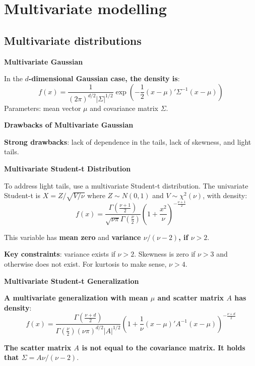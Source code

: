 \documentclass[12pt,a4paper]{article}
\begin{document}
\section{Multivariate modelling}

\subsection{Multivariate distributions}

\textbf{Multivariate Gaussian}

In the \textbf{$d$-dimensional Gaussian case, the density is}:
\[
f(x) = \frac{1}{(2\pi)^{d/2} |\Sigma|^{1/2}} \exp\left(-\frac{1}{2}(x - \mu)' \Sigma^{-1} (x - \mu)\right)
\]
Parameters: mean vector $\mu$ and covariance matrix $\Sigma$.

\vspace{0.5em}

\textbf{Drawbacks of Multivariate Gaussian}

\textbf{Strong drawbacks}: lack of dependence in the tails, lack of skewness, and light tails.

\vspace{0.5em}

\textbf{Multivariate Student-t Distribution}

To address light tails, use a multivariate Student-t distribution. The univariate Student-t is $X = Z/\sqrt{V/\nu}$ where $Z \sim N(0,1)$ and $V \sim \chi^2(\nu)$, with density:
\[
f(x) = \frac{\Gamma\left(\frac{\nu+1}{2}\right)}{\sqrt{\nu\pi}\Gamma\left(\frac{\nu}{2}\right)}\left(1 + \frac{x^2}{\nu}\right)^{-\frac{\nu+1}{2}}
\]

This variable has \textbf{mean zero} and \textbf{variance $\nu/(\nu-2)$, if $\nu > 2$}.

\textbf{Key constraints}: variance exists if $\nu > 2$. Skewness is zero if $\nu > 3$ and otherwise does not exist. For kurtosis to make sense, $\nu > 4$.

\vspace{0.5em}

\textbf{Multivariate Student-t Generalization}

\textbf{A multivariate generalization with mean $\mu$ and scatter matrix $A$ has density}:
\[
f(x) = \frac{\Gamma\left(\frac{\nu+d}{2}\right)}{\Gamma\left(\frac{\nu}{2}\right)(\nu\pi)^{d/2}|A|^{1/2}}\left(1 + \frac{1}{\nu}(x-\mu)'A^{-1}(x-\mu)\right)^{-\frac{\nu+d}{2}}
\]

\textbf{The scatter matrix $A$ is not equal to the covariance matrix. It holds that $\Sigma = A\nu/(\nu-2)$}.
\end{document}
